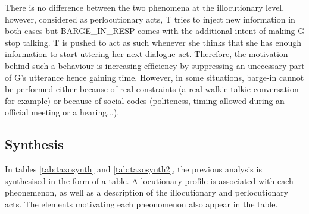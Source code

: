          There is no difference between the two phenomena at the illocutionary level, however, considered as perlocutionary acts, T tries to inject new information in both cases but BARGE\_IN\_RESP comes with the additional intent of making G stop talking. T is pushed to act as such whenever she thinks that she has enough information to start uttering her next dialogue act. Therefore, the motivation behind such a behaviour is increasing efficiency by suppressing an unecessary part of G's utterance hence gaining time. However, in some situations, barge-in cannot be performed either because of real constraints (a real walkie-talkie conversation for example) or because of social codes (politeness, timing allowed during an official meeting or a hearing...).
				
		\subsection{Synthesis}
		
			In tables \ref{tab:taxosynth} and \ref{tab:taxosynth2}, the previous analysis is synthesised in the form of a table. A locutionary profile is associated with each pheonemenon, as well as a description of the illocutionary and perlocutionary acts. The elements motivating each pheonomenon also appear in the table.
		

